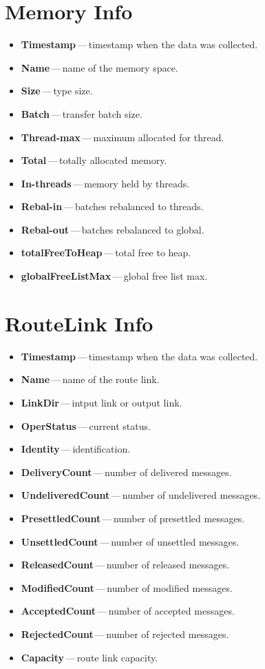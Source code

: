 \section*{Memory Info}
\begin{itemize}
  \setlength\itemsep{0em}
  \item \textbf{Timestamp}\,---\,timestamp when the data was collected.
  \item \textbf{Name}\,---\,name of the memory space.
  \item \textbf{Size}\,---\,type size.
  \item \textbf{Batch}\,---\,transfer batch size.
  \item \textbf{Thread-max}\,---\,maximum allocated for thread.
  \item \textbf{Total}\,---\,totally allocated memory.
  \item \textbf{In-threads}\,---\,memory held by threads.
  \item \textbf{Rebal-in}\,---\,batches rebalanced to threads.
  \item \textbf{Rebal-out}\,---\,batches rebalanced to global.
  \item \textbf{totalFreeToHeap}\,---\,total free to heap.
  \item \textbf{globalFreeListMax}\,---\,global free list max.
\end{itemize}


\section*{RouteLink Info}
\begin{itemize}
  \setlength\itemsep{0em}
  \item \textbf{Timestamp}\,---\,timestamp when the data was collected.
  \item \textbf{Name}\,---\,name of the route link.
  \item \textbf{LinkDir}\,---\,intput link or output link.
  \item \textbf{OperStatus}\,---\,current status.
  \item \textbf{Identity}\,---\,identification.
  \item \textbf{DeliveryCount}\,---\,number of delivered messages.
  \item \textbf{UndeliveredCount}\,---\,number of undelivered messages.
  \item \textbf{PresettledCount}\,---\,number of presettled messages.
  \item \textbf{UnsettledCount}\,---\,number of unsettled messages.
  \item \textbf{ReleasedCount}\,---\,number of released messages.
  \item \textbf{ModifiedCount}\,---\,number of modified messages.
  \item \textbf{AcceptedCount}\,---\,number of accepted messages.
  \item \textbf{RejectedCount}\,---\,number of rejected messages.
  \item \textbf{Capacity}\,---\,route link capacity.
\end{itemize}

